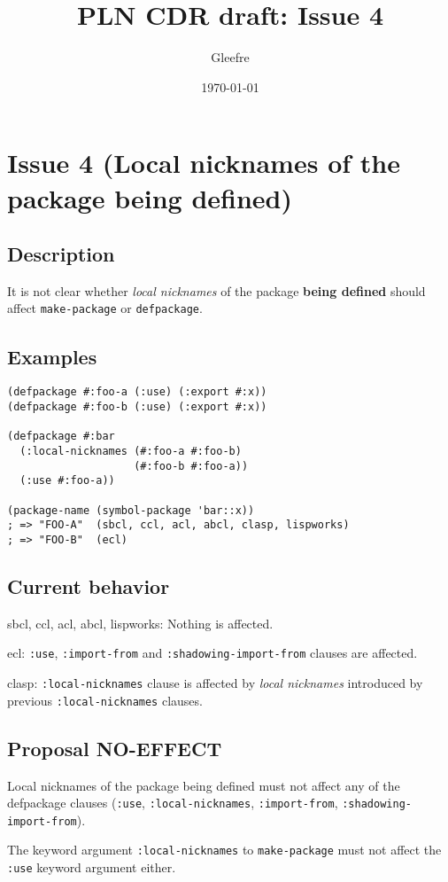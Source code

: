 \documentclass[11pt]{article}
\author{Gleefre}
\date{\today}
\title{PLN CDR draft: Issue 4}
\begin{document}
\maketitle

\section{Issue 4 (Local nicknames of the package being defined)}
\label{sec:org6b2e385}
\subsection{Description}
\label{sec:org69bc136}
It is not clear whether \emph{local nicknames} of the package \textbf{being defined} should
affect \texttt{make-package} or \texttt{defpackage}.
\subsection{Examples}
\label{sec:org9bd891a}
\begin{verbatim}
(defpackage #:foo-a (:use) (:export #:x))
(defpackage #:foo-b (:use) (:export #:x))

(defpackage #:bar
  (:local-nicknames (#:foo-a #:foo-b)
                    (#:foo-b #:foo-a))
  (:use #:foo-a))

(package-name (symbol-package 'bar::x))
; => "FOO-A"  (sbcl, ccl, acl, abcl, clasp, lispworks)
; => "FOO-B"  (ecl)
\end{verbatim}
\subsection{Current behavior}
\label{sec:orge5dc8c3}
sbcl, ccl, acl, abcl, lispworks:
  Nothing is affected.

ecl:
  \texttt{:use}, \texttt{:import-from} and \texttt{:shadowing-import-from} clauses are affected.

clasp:
  \texttt{:local-nicknames} clause is affected by \emph{local nicknames} introduced by
  previous \texttt{:local-nicknames} clauses.
\subsection{Proposal NO-EFFECT}
\label{sec:orga2c23fd}
Local nicknames of the package being defined must not affect any of the defpackage
clauses (\texttt{:use}, \texttt{:local-nicknames}, \texttt{:import-from}, \texttt{:shadowing-import-from}).

The keyword argument \texttt{:local-nicknames} to \texttt{make-package} must not affect the
\texttt{:use} keyword argument either.
\end{document}
